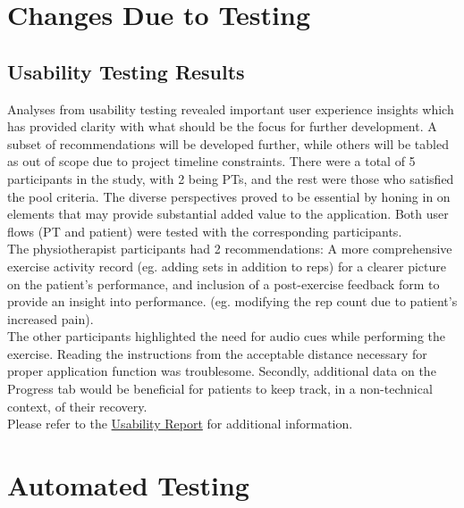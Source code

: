 \documentclass[12pt, titlepage]{article}
\begin{document}
\section{Changes Due to Testing}

\subsection{Usability Testing Results}
Analyses from usability testing revealed important user experience insights which has provided clarity with what should
be the focus for further development. A subset of recommendations will be developed further, while others will be tabled 
as out of scope due to project timeline constraints. 
There were a total of 5 participants in the study, with 2 being PTs, and the rest were those who satisfied the pool criteria.
The diverse perspectives proved to be essential by honing in on elements that may provide substantial added value to the 
application. Both user flows (PT and patient) were tested with the corresponding participants. \\
The physiotherapist participants had 2 recommendations: A more comprehensive exercise activity record (eg. adding sets in addition to reps) 
for a clearer picture on the patient's performance, and inclusion of a post-exercise feedback form to provide an insight into performance.
(eg. modifying the rep count due to patient's increased pain). \\
The other participants highlighted the need for audio cues while performing the exercise. Reading the instructions from
the acceptable distance necessary for proper application function was troublesome. Secondly, additional data on the Progress tab would
be beneficial for patients to keep track, in a non-technical context, of their recovery. \\
Please refer to the \href{../Extras/UsabilityTesting/UsabilityReport.pdf}{Usability Report} for additional information.\\



\section{Automated Testing}
\end{document}
